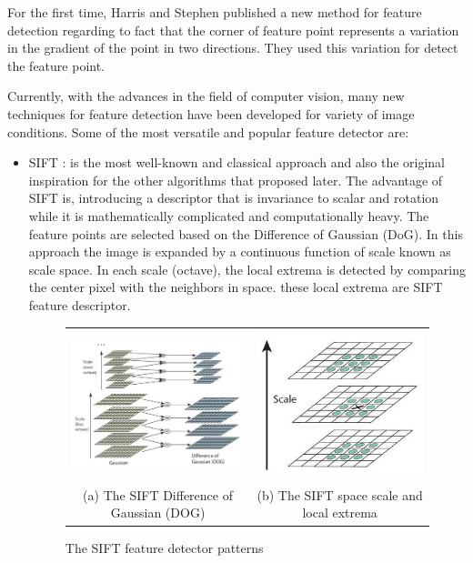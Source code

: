 For the first time, Harris and Stephen \cite{harris1988combined} published a new method for feature detection regarding to fact that the corner of feature point represents a variation in the gradient of the point in two directions. They used this variation for detect the feature point.

Currently, with the advances in the field of computer vision, many new techniques for feature detection have been developed for variety of image conditions. Some of the most versatile and popular feature detector are:
\begin{itemize}
\item SIFT \cite{lowe2004distinctive}: is the most well-known and classical approach and also the original inspiration for the other algorithms that proposed later. The advantage of SIFT is, introducing a descriptor that is invariance to scalar and rotation while it is mathematically complicated and computationally heavy. The feature points are selected based on the Difference of Gaussian (DoG). In this approach the image is expanded by a continuous function of scale known as scale space. In each scale (octave), the local extrema is detected by comparing the center pixel with the neighbors in space. these local extrema are SIFT feature descriptor.

\begin{figure}[H]
\begin{tabular}{cc}
  \includegraphics[width=60mm]{figures/sift_dog} &  \includegraphics[width=50mm]{figures/sift_scale} \\
(a) The SIFT Difference of Gaussian (DOG) & (b) The SIFT space scale and local extrema \\[6pt]
\end{tabular}
\caption{The SIFT feature detector patterns}   \label{fig:sift_detector}
\end{figure}



\end{itemize}
